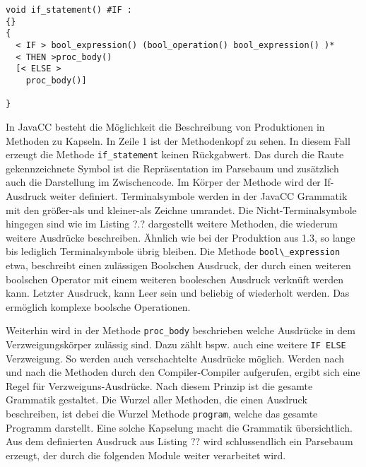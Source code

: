 \begin{verbatim}
void if_statement() #IF :
{}
{
  < IF > bool_expression() (bool_operation() bool_expression() )*
  < THEN >proc_body()
  [< ELSE >
  	proc_body()]
  	
}
\end{verbatim}

In JavaCC besteht die Möglichkeit die Beschreibung von Produktionen in Methoden zu Kapseln.
In Zeile 1 ist der Methodenkopf zu sehen. In diesem Fall erzeugt die Methode \verb+if_statement+ keinen Rückgabwert.
Das durch die Raute gekennzeichnete Symbol ist die Repräsentation im Parsebaum und zusätzlich auch die Darstellung im Zwischencode.
Im Körper der Methode wird der If-Ausdruck weiter definiert. Terminalsymbole werden in der JavaCC Grammatik mit den größer-als und kleiner-als Zeichne umrandet. Die Nicht-Terminalsymbole hingegen sind wie im Listing ?.? dargestellt weitere Methoden, die wiederum weitere Ausdrücke beschreiben.
Ähnlich wie bei der Produktion aus 1.3, so lange bis lediglich Terminalsymbole übrig bleiben.
Die Methode \verb+bool\_expression+ etwa, beschreibt einen zulässigen Boolschen Ausdruck, der durch einen weiteren boolschen Operator mit einem weiteren booleschen Ausdruck verknüft werden kann.
Letzter Ausdruck, kann Leer sein und beliebig of wiederholt werden. Das ermöglich komplexe boolsche Operationen.

Weiterhin wird in der Methode \verb+proc_body+ beschrieben welche Ausdrücke in dem Verzweigungskörper zulässig sind. Dazu zählt bspw. auch eine weitere \verb+IF ELSE+ Verzweigung. So werden auch verschachtelte Ausdrücke möglich.
Werden nach und nach die Methoden durch den Compiler-Compiler aufgerufen, ergibt sich eine Regel für Verzweiguns-Ausdrücke. Nach diesem Prinzip ist die gesamte Grammatik gestaltet. 
Die Wurzel aller Methoden, die einen Ausdruck beschreiben, ist debei die Wurzel Methode \verb+program+, welche das gesamte Programm darstellt. Eine solche Kapselung macht die Grammatik übersichtlich.
Aus dem definierten Ausdruck aus Listing ?? wird schlussendlich ein Parsebaum erzeugt, der durch die folgenden Module weiter verarbeitet wird.


